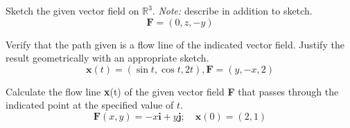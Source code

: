 \documentclass[boxes]{gsypset}
\begin{document}
\begin{problem}[3.3.9]
	Sketch the given vector field on $\mathbb{R}^3$.
	\textit{Note:} describe in addition to sketch.
	\[
		\textbf{F}=(0,z,-y)
	\]
\end{problem}
\begin{solution}
	
\end{solution}

\begin{problem}[3.3.18]
	Verify that the path given is a flow line of the indicated vector field. 
	Justify the result geometrically with an appropriate sketch.
	\[
		\textbf{x}(t)=(\sin t,\cos t,2t),\textbf{F}=(y,-x,2)
	\]
\end{problem}
\begin{solution}
	
\end{solution}


\begin{problem}[3.3.20]
	Calculate the flow line \textbf{x}(t) of the given vector field \textbf{F}
	that passes through the indicated point at the specified value of $t$.
	\[
		\textbf{F}(x,y)=-x\textbf{i}+y\textbf{j};\quad\textbf{x}(0)=(2,1)
	\]
\end{problem}
\begin{solution}
	
\end{solution}
\end{document}
